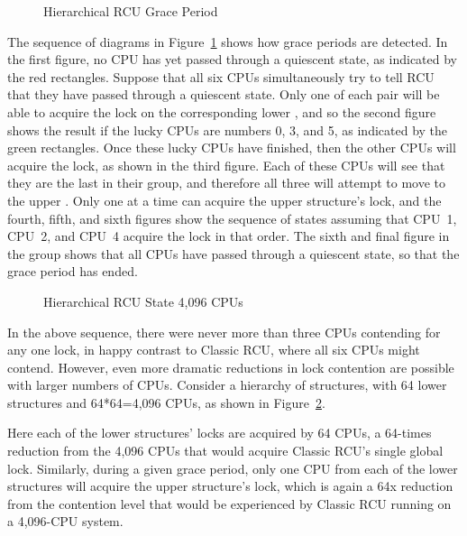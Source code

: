\begin{figure}[htbp]
\centering
{}
\caption{Hierarchical RCU Grace Period}
\label{fig:app:rcuimpl:rcutree:Hierarchical RCU Grace Period}
\end{figure}

The sequence of diagrams in
Figure~\ref{fig:app:rcuimpl:rcutree:Hierarchical RCU Grace Period}
shows how grace periods are detected.
In the first figure, no CPU has yet passed through a quiescent state,
as indicated by the red rectangles.
Suppose that all six CPUs simultaneously try to tell RCU that they have
passed through a quiescent state.
Only one of each pair will be able to acquire the lock on the
corresponding lower , and so the second figure
shows the result if the lucky CPUs are numbers 0, 3, and 5, as indicated
by the green rectangles.
Once these lucky CPUs have finished, then the other CPUs will acquire
the lock, as shown in the third figure.
Each of these CPUs will see that they are the last in their group,
and therefore all three will attempt to move to the upper
.
Only one at a time can acquire the upper  structure's
lock, and the fourth, fifth, and sixth figures show the sequence of
states assuming that CPU~1, CPU~2, and CPU~4 acquire
the lock in that order.
The sixth and final figure in the group shows that all CPUs have passed
through a quiescent state, so that the grace period has ended.

\begin{figure}[htb]
\centering
{}
\caption{Hierarchical RCU State 4,096 CPUs}
\label{fig:app:rcuimpl:rcutree:Hierarchical RCU State 4,096 CPUs}
\end{figure}

In the above sequence, there were never more than three CPUs
contending for any one lock, in happy contrast to Classic RCU,
where all six CPUs might contend.
However, even more dramatic reductions in lock contention are
possible with larger numbers of CPUs.
Consider a hierarchy of  structures, with
64 lower structures and 64*64=4,096 CPUs, as shown in
Figure~\ref{fig:app:rcuimpl:rcutree:Hierarchical RCU State 4,096 CPUs}.

Here each of the lower  structures' locks
are acquired by 64 CPUs, a 64-times reduction from the 4,096 CPUs
that would acquire Classic RCU's single global lock.
Similarly, during a given grace period, only one CPU from each of
the lower  structures will acquire the
upper  structure's lock, which is again
a 64x reduction from the contention level that would be experienced
by Classic RCU running on a 4,096-CPU system.

